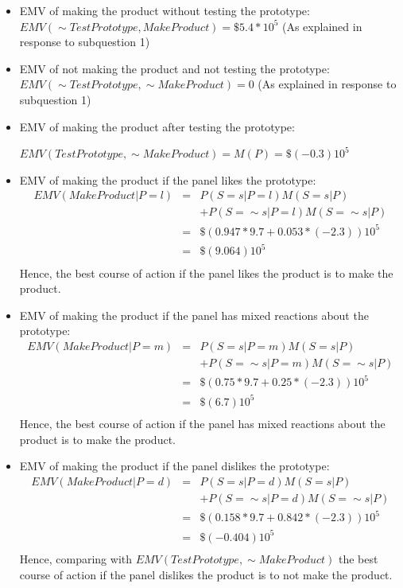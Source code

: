 \documentclass[10pt]{article}
\begin{document}
\begin{itemize}
 \item EMV of making the product without testing the prototype: $EMV(\sim TestPrototype, MakeProduct) =\$5.4*10^{5}$ (As explained in response to subquestion 1)
 \item EMV of not making the product and not testing the prototype: $EMV(\sim TestPrototype, \sim MakeProduct)= 0$ (As explained in response to subquestion 1)
 \item EMV of making the product after testing the prototype: 

$EMV(TestPrototype, \sim MakeProduct)=M(P)=\$(-0.3)10^{5}$

 \item EMV of making the product if the panel likes the prototype:
\begin{eqnarray}
EMV(MakeProduct|P=l) & = & P(S=s|P=l)M(S=s|P)\\
&&+P(S= \sim s|P=l)M(S= \sim s|P)\\
& = &\$(0.947*9.7+0.053*(-2.3))10^{5}\\
& = &\$(9.064)10^{5}\\
\end{eqnarray}
Hence, the best course of action if the panel likes the product is to make the product.
 \item EMV of making the product if the panel has mixed reactions about the prototype:
\begin{eqnarray}
EMV(MakeProduct|P=m) & = & P(S=s|P=m)M(S=s|P)\\
&&+P(S= \sim s|P=m)M(S= \sim s|P)\\
& = &\$(0.75*9.7+0.25*(-2.3))10^{5}\\
& = &\$(6.7)10^{5}\\
\end{eqnarray}
Hence, the best course of action if the panel has mixed reactions about the product is to make the product.
 \item EMV of making the product if the panel dislikes the prototype:
\begin{eqnarray}
EMV(MakeProduct|P=d) & = & P(S=s|P=d)M(S=s|P)\\
&&+P(S= \sim s|P=d)M(S= \sim s|P)\\
& = &\$(0.158*9.7+0.842*(-2.3))10^{5}\\
& = &\$(-0.404)10^{5}\\
\end{eqnarray}
Hence, comparing with $EMV(TestPrototype, \sim MakeProduct)$ the best course of action if the panel dislikes the product is to not make the product.


\end{itemize}
\end{document}
